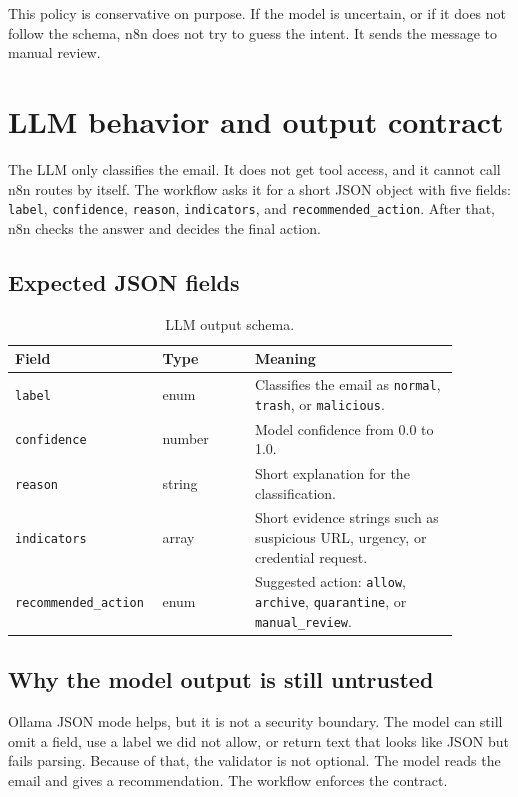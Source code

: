 \documentclass[11pt,a4paper]{article}
\begin{document}
This policy is conservative on purpose. If the model is uncertain, or if it does not follow the schema, n8n does not try to guess the intent. It sends the message to manual review.

\clearpage

\section{LLM behavior and output contract}

The LLM only classifies the email. It does not get tool access, and it cannot call n8n routes by itself. The workflow asks it for a short JSON object with five fields: \texttt{label}, \texttt{confidence}, \texttt{reason}, \texttt{indicators}, and \texttt{recommended\_action}. After that, n8n checks the answer and decides the final action.

\subsection{Expected JSON fields}

\begin{table}[h]
\centering
\begin{tabular}{p{0.24\linewidth} p{0.2\linewidth} p{0.44\linewidth}}
\toprule
\textbf{Field} & \textbf{Type} & \textbf{Meaning} \\
\midrule
\texttt{label} & enum & Classifies the email as \texttt{normal}, \texttt{trash}, or \texttt{malicious}. \\
\texttt{confidence} & number & Model confidence from 0.0 to 1.0. \\
\texttt{reason} & string & Short explanation for the classification. \\
\texttt{indicators} & array & Short evidence strings such as suspicious URL, urgency, or credential request. \\
\texttt{recommended\_action} & enum & Suggested action: \texttt{allow}, \texttt{archive}, \texttt{quarantine}, or \texttt{manual\_review}. \\
\bottomrule
\end{tabular}
\caption{LLM output schema.}
\end{table}

\subsection{Why the model output is still untrusted}

Ollama JSON mode helps, but it is not a security boundary. The model can still omit a field, use a label we did not allow, or return text that looks like JSON but fails parsing. Because of that, the validator is not optional. The model reads the email and gives a recommendation. The workflow enforces the contract.
\end{document}
